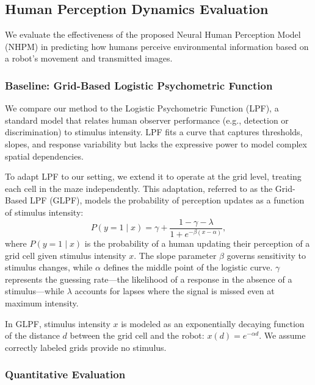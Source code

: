 \subsection{Human Perception Dynamics Evaluation}
We evaluate the effectiveness of the proposed Neural Human Perception Model (NHPM) in predicting how humans perceive environmental information based on a robot’s movement and transmitted images.

\subsubsection{Baseline: Grid-Based Logistic Psychometric Function}
We compare our method to the Logistic Psychometric Function (LPF), a standard model that relates human observer performance (e.g., detection or discrimination) to stimulus intensity. LPF fits a curve that captures thresholds, slopes, and response variability but lacks the expressive power to model complex spatial dependencies.

To adapt LPF to our setting, we extend it to operate at the grid level, treating each cell in the maze independently. This adaptation, referred to as the Grid-Based LPF (GLPF), models the probability of perception updates as a function of stimulus intensity:
\begin{equation}
P(y = 1 \mid x) = \gamma + \frac{1 - \gamma - \lambda}{1 + e^{-\beta (x - \alpha)}},
\end{equation}
where $P(y = 1 \mid x)$ is the probability of a human updating their perception of a grid cell given stimulus intensity $x$. The slope parameter $\beta$ governs sensitivity to stimulus changes, while $\alpha$ defines the middle point of the logistic curve. $\gamma$ represents the guessing rate---the likelihood of a response in the absence of a stimulus---while $\lambda$ accounts for lapses where the signal is missed even at maximum intensity.

In GLPF, stimulus intensity $x$ is modeled as an exponentially decaying function of the distance $d$ between the grid cell and the robot: $x(d) = e^{-\alpha d}$. We assume correctly labeled grids provide no stimulus.

\subsubsection{Quantitative Evaluation}

